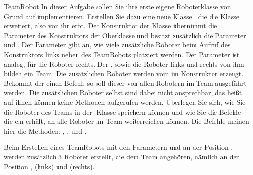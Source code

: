 \documentclass{../tuda-exercise}
\begin{document}
  \begin{task}[credit=\stars{3}{3}]{TeamRobot}
    In dieser Aufgabe sollen Sie ihre erste eigene Roboterklasse von Grund auf implementieren.
    Erstellen Sie dazu eine neue Klasse , die die Klasse 
    erweitert, also von ihr erbt. Der Konstruktor der Klasse  übernimmt die
    Parameter des Konstruktors der Oberklasse  und besitzt zusätzlich die
    Parameter  und . Der Parameter  gibt an, wie viele zusätzliche Roboter beim Aufruf des Konstruktors links neben des
    TeamRobots platziert werden. Der Parameter  ist analog, für die Roboter
    rechts. Der , sowie die Roboter links und rechts von ihm bilden ein
    Team. Die zusätzlichen Roboter werden vom  im Konstruktor erzeugt.
    Bekommt der  einen Befehl, so soll dieser von allen Robotern im Team
    ausgeführt werden. Die zusätzlichen Roboter selbst sind dabei nicht ansprechbar, das heißt
    auf ihnen können keine Methoden aufgerufen werden. Überlegen Sie sich, wie Sie die Roboter
    des Teams in der -Klasse speichern können und wie Sie die Befehle die ein
     erhält, an alle Roboter im Team weiterreichen können. Die Befehle
    meinen hier die Methoden: , ,
     und .

    \br

    \begin{note}[title=Beispiel:]
      Beim Erstellen eines TeamRobots mit den Parametern  und
       an der Position , werden zusätzlich 3 Roboter
      erstellt, die dem Team angehören, nämlich an der Position ,
       (links) und  (rechts).
    \end{note}


    \clearpagesolution

    \begin{solution}
      
    \end{solution}
  \end{task}
\end{document}
